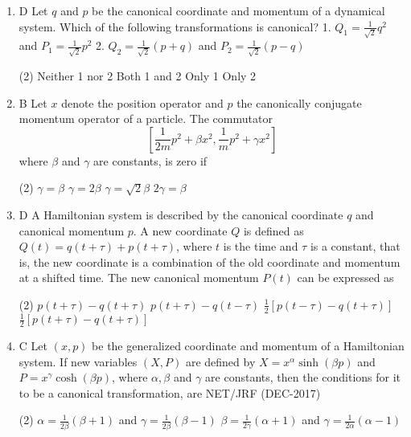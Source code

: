 \begin{enumerate}
	\item D Let $q$ and $p$ be the canonical coordinate and momentum of a dynamical system. Which of the following transformations is canonical?
	1. $Q_{1}=\frac{1}{\sqrt{2}} q^{2}$ and $P_{1}=\frac{1}{\sqrt{2}} p^{2}$
	2. $Q_{2}=\frac{1}{\sqrt{2}}(p+q)$ and $P_{2}=\frac{1}{\sqrt{2}}(p-q)$
	{}
	 \begin{tasks}(2)
		\task[\textbf{a.}]Neither 1 nor 2
		\task[\textbf{b.}]Both 1 and 2
		\task[\textbf{c.}]Only 1
		\task[\textbf{d.}] Only 2
	\end{tasks}
	\item B Let $x$ denote the position operator and $p$ the canonically conjugate momentum operator of a particle. The commutator
	$$
	\left[\frac{1}{2 m} p^{2}+\beta x^{2}, \frac{1}{m} p^{2}+\gamma x^{2}\right]
	$$
	where $\beta$ and $\gamma$ are constants, is zero if
	{}
	 \begin{tasks}(2)
		\task[\textbf{a.}]$\gamma=\beta$
		\task[\textbf{b.}]$\gamma=2 \beta$
		\task[\textbf{c.}]$\gamma=\sqrt{2} \beta$
		\task[\textbf{d.}] $2 \gamma=\beta$
	\end{tasks}
	\item D A Hamiltonian system is described by the canonical coordinate $q$ and canonical momentum $p$. A new coordinate $Q$ is defined as $Q(t)=q(t+\tau)+p(t+\tau)$, where $t$ is the time and $\tau$ is a constant, that is, the new coordinate is a combination of the old coordinate and momentum at a shifted time. The new canonical momentum $P(t)$ can be expressed as
{}
	 \begin{tasks}(2)
		\task[\textbf{a.}]$p(t+\tau)-q(t+\tau)$
		\task[\textbf{b.}]$p(t+\tau)-q(t-\tau)$
		\task[\textbf{c.}]$\frac{1}{2}[p(t-\tau)-q(t+\tau)]$
		\task[\textbf{d.}] $\frac{1}{2}[p(t+\tau)-q(t+\tau)]$
	\end{tasks}
	\item C Let $(x, p)$ be the generalized coordinate and momentum of a Hamiltonian system. If new variables $(X, P)$ are defined by $X=x^{\alpha} \sinh (\beta p)$ and $P=x^{\gamma} \cosh (\beta p)$, where $\alpha, \beta$ and $\gamma$ are constants, then the conditions for it to be a canonical transformation, are
	NET/JRF (DEC-2017)
	 \begin{tasks}(2)
		\task[\textbf{a.}]$\alpha=\frac{1}{2 \beta}(\beta+1)$ and $\gamma=\frac{1}{2 \beta}(\beta-1)$
		\task[\textbf{b.}]$\beta=\frac{1}{2 \gamma}(\alpha+1)$ and $\gamma=\frac{1}{2 \alpha}(\alpha-1)$

\end{tasks}
\end{enumerate}
